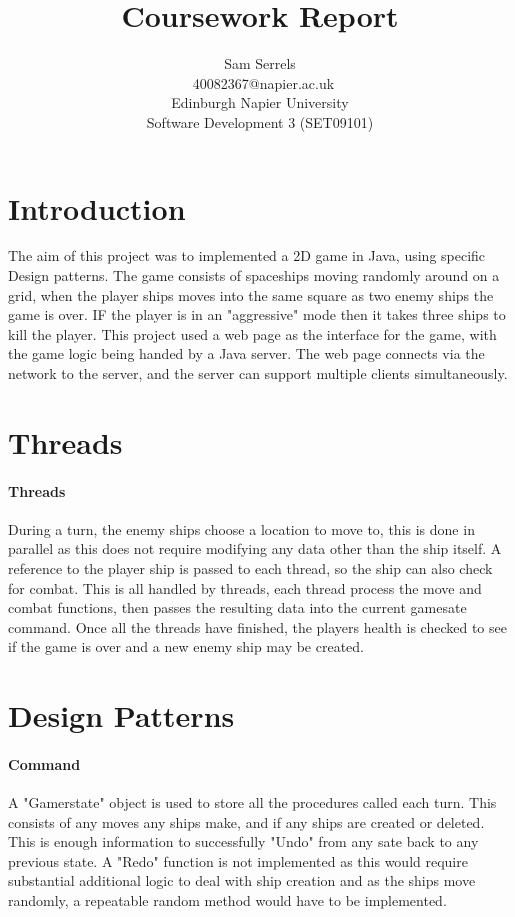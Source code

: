\documentclass[conference]{acmsiggraph}
\title{Coursework Report}
\author{Sam Serrels\\\ 40082367@napier.ac.uk \\
Edinburgh Napier University\\
Software Development 3 (SET09101)}
\begin{document}
\maketitle

\section{Introduction}

The aim of this project was to implemented a 2D game in Java, using specific Design patterns. The game consists of spaceships moving randomly around on a grid, when the player ships moves into the same square as two enemy ships the game is over. IF the player is in an "aggressive" mode then it takes three ships to kill the player. This project used a web page as the interface for the game, with the game logic being handed by a Java server. The web page connects via the network to the server, and the server can support multiple clients simultaneously.

\section{Threads}
\paragraph{Threads}
During a turn, the enemy ships choose a location to move to, this is done in parallel as this does not require modifying any data other than the ship itself. A reference to the player ship is passed to each thread, so the ship can also check for combat. This is all handled by threads, each thread process the move and combat functions, then passes the resulting data into the current gamesate command. Once all the threads have finished, the players health is checked to see if the game is over and a new enemy ship may be created.

\section{Design Patterns}
\paragraph{Command}
A "Gamerstate" object is used to store all the procedures called each turn. This consists of any moves any ships make, and if any ships are created or deleted. This is enough information to successfully "Undo" from any sate back to any previous state. A "Redo" function is not implemented as this would require substantial additional logic to deal with ship creation and as the ships move randomly, a repeatable random method would have to be implemented.
\end{document}
